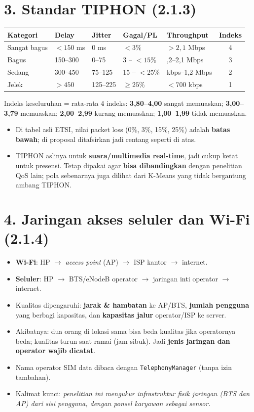 \section*{3. Standar TIPHON (2.1.3)}
\begin{hafal}
\small\begin{tabularx}{\linewidth}{@{}l>{\raggedright}X>{\raggedright}X>{\raggedright}X>{\raggedright\arraybackslash}Xc@{}}
Kategori & Delay & Jitter & Gagal/PL & Throughput & Indeks\\
\midrule
Sangat bagus & $<150$ ms & 0 ms & $<3\%$ & $>2{,}1$ Mbps & 4\\
Bagus & 150--300 & 0--75 & 3 -- $<15\%$ & 1,2--2,1 Mbps & 3\\
Sedang & 300--450 & 75--125 & 15 -- $<25\%$ & 700 kbps--1,2 Mbps & 2\\
Jelek & $>450$ & 125--225 & $\geq 25\%$ & $<700$ kbps & 1\\
\end{tabularx}

\medskip
Indeks keseluruhan = rata-rata 4 indeks: \textbf{3,80--4,00} sangat memuaskan; \textbf{3,00--3,79} memuaskan; \textbf{2,00--2,99} kurang memuaskan; \textbf{1,00--1,99} tidak memuaskan.
\end{hafal}
\begin{itemize}
  \item Di tabel asli ETSI, nilai packet loss (0\%, 3\%, 15\%, 25\%) adalah \textbf{batas bawah}; di proposal ditafsirkan jadi rentang seperti di atas.
  \item TIPHON aslinya untuk \textbf{suara/multimedia real-time}, jadi cukup ketat untuk presensi. Tetap dipakai agar \textbf{bisa dibandingkan} dengan penelitian QoS lain; pola sebenarnya juga dilihat dari K-Means yang tidak bergantung ambang TIPHON.
\end{itemize}

\section*{4. Jaringan akses seluler dan Wi-Fi (2.1.4)}
\begin{itemize}
  \item \textbf{Wi-Fi}: HP $\rightarrow$ \textit{access point} (AP) $\rightarrow$ ISP kantor $\rightarrow$ internet.
  \item \textbf{Seluler}: HP $\rightarrow$ BTS/eNodeB operator $\rightarrow$ jaringan inti operator $\rightarrow$ internet.
  \item Kualitas dipengaruhi: \textbf{jarak \& hambatan} ke AP/BTS, \textbf{jumlah pengguna} yang berbagi kapasitas, dan \textbf{kapasitas jalur} operator/ISP ke server.
  \item Akibatnya: dua orang di lokasi sama bisa beda kualitas jika operatornya beda; kualitas turun saat ramai (jam sibuk). Jadi \textbf{jenis jaringan dan operator wajib dicatat}.
  \item Nama operator SIM data dibaca dengan \texttt{TelephonyManager} (tanpa izin tambahan).
  \item Kalimat kunci: \textit{penelitian ini mengukur infrastruktur fisik jaringan (BTS dan AP) dari sisi pengguna, dengan ponsel karyawan sebagai sensor.}
\end{itemize}

